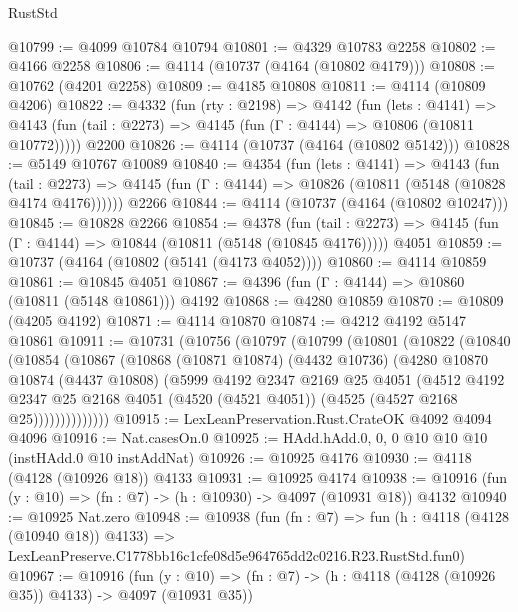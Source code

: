 \begin{lexlean}{RustStd}
\begin{coremodule}
@10799 := @4099 @10784 @10794
@10801 := @4329 @10783 @2258
@10802 := @4166 @2258
@10806 := @4114 (@10737 (@4164 (@10802 @4179)))
@10808 := @10762 (@4201 @2258)
@10809 := @4185 @10808
@10811 := @4114 (@10809 @4206)
@10822 := @4332
    (fun (rty : @2198) =>
    @4142
      (fun (lets : @4141) =>
      @4143 (fun (tail : @2273) => @4145 (fun (Γ : @4144) => @10806 (@10811 @10772)))))
    @2200
@10826 := @4114 (@10737 (@4164 (@10802 @5142)))
@10828 := @5149 @10767 @10089
@10840 := @4354
    (fun (lets : @4141) =>
    @4143
      (fun (tail : @2273) =>
      @4145 (fun (Γ : @4144) => @10826 (@10811 (@5148 (@10828 @4174 @4176))))))
    @2266
@10844 := @4114 (@10737 (@4164 (@10802 @10247)))
@10845 := @10828 @2266
@10854 := @4378
    (fun (tail : @2273) => @4145 (fun (Γ : @4144) => @10844 (@10811 (@5148 (@10845 @4176)))))
    @4051
@10859 := @10737 (@4164 (@10802 (@5141 (@4173 @4052))))
@10860 := @4114 @10859
@10861 := @10845 @4051
@10867 := @4396 (fun (Γ : @4144) => @10860 (@10811 (@5148 @10861))) @4192
@10868 := @4280 @10859
@10870 := @10809 (@4205 @4192)
@10871 := @4114 @10870
@10874 := @4212 @4192 @5147 @10861
@10911 := @10731
    (@10756
      (@10797
        (@10799
          (@10801
            (@10822
              (@10840
                (@10854
                  (@10867
                    (@10868
                      (@10871 @10874)
                      (@4432 @10736)
                      (@4280
                        @10870
                        @10874
                        (@4437 @10808)
                        (@5999
                          @4192
                          @2347
                          @2169
                          @25
                          @4051
                          (@4512
                            @4192
                            @2347
                            @25
                            @2168
                            @4051
                            (@4520 (@4521 @4051))
                            (@4525 (@4527 @2168 @25))))))))))))))
@10915 := LexLeanPreservation.Rust.CrateOK @4092 @4094 @4096
@10916 := Nat.casesOn.{0}
@10925 := HAdd.hAdd.{0, 0, 0} @10 @10 @10 (instHAdd.{0} @10 instAddNat)
@10926 := @10925 @4176
@10930 := @4118 (@4128 (@10926 @18)) @4133
@10931 := @10925 @4174
@10938 := @10916 (fun (y : @10) => (fn : @7) -> (h : @10930) -> @4097 (@10931 @18)) @4132
@10940 := @10925 Nat.zero
@10948 := @10938
    (fun (fn : @7) =>
    fun (h : @4118 (@4128 (@10940 @18)) @4133) =>
    LexLeanPreserve.C1778bb16c1cfe08d5e964765dd2c0216.R23.RustStd.fun0)
@10967 := @10916
    (fun (y : @10) => (fn : @7) -> (h : @4118 (@4128 (@10926 @35)) @4133) -> @4097 (@10931 @35))

\end{coremodule}
\end{lexlean}
